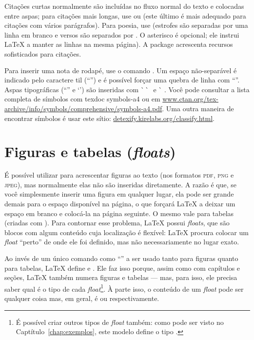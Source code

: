 Citações curtas normalmente são incluídas no fluxo normal do texto e colocadas
entre aspas; para citações mais longas, use  ou
 (este último é mais adequado para citações com
vários parágrafos). Para poesia, use  (estrofes são separadas por
uma linha em branco e versos são separados por \cmd{\sla\sla{}*}. O asterisco
é opcional; ele instrui \LaTeX{} a manter as linhas na mesma página). A package
 acrescenta recursos sofisticados para citações.

Para inserir uma nota de rodapé, use o comando
. Um espaço
não-separável é indicado pelo caractere til (``\cmd{\textasciitilde{}}'')
e é possível forçar uma quebra de linha com ``\cmd{\sla\sla{}}''. Aspas
tipográficas (``\;'' e `\;') são inseridas com
\`\space\,\`\space\space\,\textquotesingle\,\textquotesingle{} e
\`\space\,\,\textquotesingle. Você pode consultar a lista completa de
símbolos com \textsf{texdoc symbols-a4} ou em \url{www.ctan.org/tex-archive/info/symbols/comprehensive/symbols-a4.pdf}.
Uma outra maneira de encontrar símbolos é usar este sítio: \url{detexify.kirelabs.org/classify.html}.

\section{Figuras e tabelas (\emph{floats})}
\label{sec:floats}

É possível utilizar  para acrescentar figuras
ao texto (nos formatos \textsc{pdf}, \textsc{png} e \textsc{jpeg}),
mas normalmente elas não são inseridas diretamente. A razão é que, se
você simplesmente inserir uma figura em qualquer lugar, ela pode
ser grande demais para o espaço disponível na página, o que forçará
\LaTeX{} a deixar um espaço em branco e colocá-la na página seguinte.
O mesmo vale para tabelas (criadas com ).
Para contornar esse problema, \LaTeX{} possui \emph{floats}, que
são blocos com algum conteúdo cuja localização é flexível: \LaTeX{}
procura colocar um \emph{float} ``perto'' de onde ele foi definido,
mas não necessariamente no lugar exato.

Ao invés de um único comando como ``'' a
ser usado tanto para figuras quanto para tabelas, \LaTeX{} define
 e . Ele faz isso
porque, assim como com capítulos e seções, \LaTeX{} também numera
figuras e tabelas --- mas, para isso, ele precisa saber qual é o tipo de
cada \emph{float}\footnote{É possível criar outros tipos de \emph{float}
também: como pode ser visto no Captítulo~\ref{chap:exemplos}, este
modelo define o tipo .}. À parte isso, o conteúdo de
um \emph{float} pode ser qualquer coisa mas, em geral, é
 ou  respectivamente.

